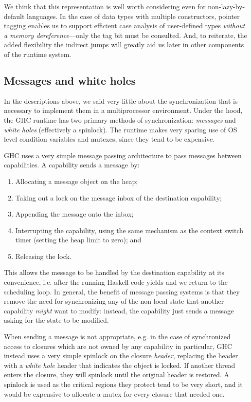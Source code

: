 We think that this representation is well worth considering even for
non-lazy-by-default languages.  In the case of data types with multiple
constructors, pointer tagging enables us to support efficient case
analysis of user-defined types \emph{without a memory
dereference}---only the tag bit must be consulted.  And, to reiterate,
the added flexibility the indirect jumps will greatly aid us later in
other components of the runtime system.

\subsection{Messages and white holes}

In the descriptions above, we said very little about the synchronization
that is necessary to implement them in a multiprocessor environment.
Under the hood, the GHC runtime has two primary methods of synchronization:
\emph{messages} and \emph{white holes} (effectively a spinlock).  The
runtime makes very sparing use of OS level condition variables and
mutexes, since they tend to be expensive.

GHC uses a very simple message passing architecture to pass messages
between capabilities.  A capability sends a message by:

\begin{enumerate}
    \item Allocating a message object on the heap;
    \item Taking out a lock on the message inbox of the destination capability;
    \item Appending the message onto the inbox;
    \item Interrupting the capability, using the same mechanism as the context switch timer (setting the heap limit to zero); and
    \item Releasing the lock.
\end{enumerate}

This allows the message to be handled by the destination capability at
its convenience, i.e. after the running Haskell code yields and we
return to the scheduling loop.  In general, the benefit of message
passing systems is that they remove the need for synchronizing any of
the non-local state that another capability \emph{might} want to modify: instead,
the capability just sends a message asking for the state to be modified.

When sending a message is not appropriate, e.g. in the case of
synchronized access to closures which are not owned by any capability in
particular, GHC instead uses a very simple spinlock on the closure
\emph{header}, replacing the header with a \emph{white hole} header that
indicates the object is locked.  If another thread enters the closure,
they will spinlock until the original header is restored.  A spinlock is
used as the critical regions they protect tend to be very short, and it would
be expensive to allocate a mutex for every closure that needed one.

